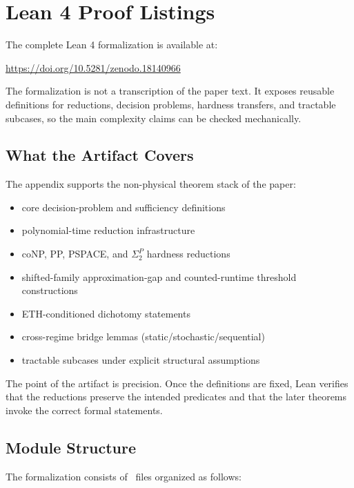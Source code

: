 \section{Lean 4 Proof Listings}\label{app:lean}

The complete Lean 4 formalization is available at:
\begin{center}
\url{https://doi.org/10.5281/zenodo.18140966}
\end{center}

The formalization is not a transcription of the paper text. It exposes reusable definitions for reductions, decision problems, hardness transfers, and tractable subcases, so the main complexity claims can be checked mechanically.

\subsection{What the Artifact Covers}

The appendix supports the non-physical theorem stack of the paper:
\begin{itemize}
\item core decision-problem and sufficiency definitions
\item polynomial-time reduction infrastructure
\item coNP, PP, PSPACE, and $\Sigma_2^P$ hardness reductions
\item shifted-family approximation-gap and counted-runtime threshold constructions
\item ETH-conditioned dichotomy statements
\item cross-regime bridge lemmas (static/stochastic/sequential)
\item tractable subcases under explicit structural assumptions
\end{itemize}

The point of the artifact is precision. Once the definitions are fixed, Lean verifies that the reductions preserve the intended predicates and that the later theorems invoke the correct formal statements.

\subsection{Module Structure}

The formalization consists of \LeanTotalFiles\ files organized as follows:

